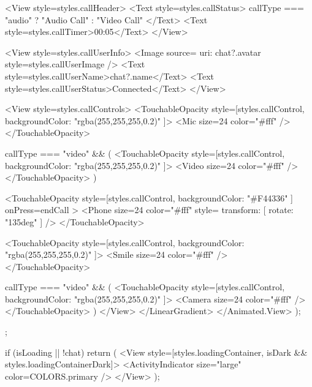 {{          <View style={styles.callHeader}>
            <Text style={styles.callStatus}>
              {callType === "audio" ? "Audio Call" : "Video Call"}
            </Text>
            <Text style={styles.callTimer}>00:05</Text>
          </View>
          
          <View style={styles.callUserInfo}>
            <Image source={{ uri: chat?.avatar }} style={styles.callUserImage} />
            <Text style={styles.callUserName}>{chat?.name}</Text>
            <Text style={styles.callUserStatus}>Connected</Text>
          </View>
          
          <View style={styles.callControls}>
            <TouchableOpacity style={[styles.callControl, { backgroundColor: "rgba(255,255,255,0.2)" }]}>
              <Mic size={24} color="#fff" />
            </TouchableOpacity>
            
            {callType === "video" && (
              <TouchableOpacity style={[styles.callControl, { backgroundColor: "rgba(255,255,255,0.2)" }]}>
                <Video size={24} color="#fff" />
              </TouchableOpacity>
            )}
            
            <TouchableOpacity 
              style={[styles.callControl, { backgroundColor: "#F44336" }]}
              onPress={endCall}
            >
              <Phone size={24} color="#fff" style={{ transform: [{ rotate: "135deg" }] }} />
            </TouchableOpacity>
            
            <TouchableOpacity style={[styles.callControl, { backgroundColor: "rgba(255,255,255,0.2)" }]}>
              <Smile size={24} color="#fff" />
            </TouchableOpacity>
            
            {callType === "video" && (
              <TouchableOpacity style={[styles.callControl, { backgroundColor: "rgba(255,255,255,0.2)" }]}>
                <Camera size={24} color="#fff" />
              </TouchableOpacity>
            )}
          </View>
        </LinearGradient>
      </Animated.View>
    );
  };

  if (isLoading || !chat) {
    return (
      <View style={[styles.loadingContainer, isDark && styles.loadingContainerDark]}>
        <ActivityIndicator size="large" color={COLORS.primary} />
      </View>
    );
  }

}
